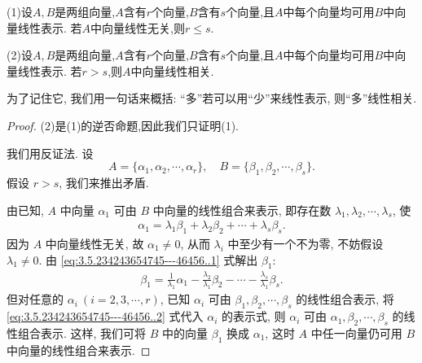 \documentclass[../../main.tex]{subfiles}%
\begin{document}
\begin{lemma}[源泉定理]\label{lemma:源泉定理}
(1)设\(A,B\)是两组向量,\(A\)含有\(r\)个向量,\(B\)含有\(s\)个向量,且\(A\)中每个向量均可用\(B\)中向量线性表示. 若\(A\)中向量线性无关,则\(r\leqslant  s\).

(2)设\(A,B\)是两组向量,\(A\)含有\(r\)个向量,\(B\)含有\(s\)个向量,且\(A\)中每个向量均可用\(B\)中向量线性表示. 若\(r > s\),则\(A\)中向量线性相关.
\end{lemma}
\begin{note}
为了记住它, 我们用一句话来概括: “多”若可以用“少”来线性表示, 则“多”线性相关.
\end{note}
\begin{proof}
(2)是(1)的逆否命题,因此我们只证明(1).

我们用反证法. 设
\[
A = \{\alpha_1, \alpha_2, \cdots, \alpha_r\},
\quad
B = \{\beta_1, \beta_2, \cdots, \beta_s\}.
\]
假设 \( r > s \), 我们来推出矛盾.

由已知, \( A \) 中向量 \( \alpha_1 \) 可由 \( B \) 中向量的线性组合来表示, 即存在数 \( \lambda_1, \lambda_2, \cdots, \lambda_s \), 使
\begin{align}
\alpha_1 = \lambda_1\beta_1 + \lambda_2\beta_2 + \cdots + \lambda_s\beta_s. \label{eq:3.5.234243654745---46456..1}
\end{align}
因为 \( A \) 中向量线性无关, 故 \( \alpha_1 \neq 0 \), 从而 \( \lambda_i \) 中至少有一个不为零, 不妨假设 \( \lambda_1 \neq 0 \). 由 \eqref{eq:3.5.234243654745---46456..1} 式解出 \( \beta_1 \):
\begin{align}
\beta_1 = \frac{1}{\lambda_1}\alpha_1 - \frac{\lambda_2}{\lambda_1}\beta_2 - \cdots - \frac{\lambda_s}{\lambda_1}\beta_s. \label{eq:3.5.234243654745---46456..2}
\end{align}
但对任意的 \( \alpha_i \ (i = 2, 3, \cdots, r) \), 已知 \( \alpha_i \) 可由 \( \beta_1, \beta_2, \cdots, \beta_s \) 的线性组合表示, 将 \eqref{eq:3.5.234243654745---46456..2} 式代入 \( \alpha_i \) 的表示式, 则 \( \alpha_i \) 可由 \( \alpha_1, \beta_2, \cdots, \beta_s \) 的线性组合表示. 这样, 我们可将 \( B \) 中的向量 \( \beta_1 \) 换成 \( \alpha_1 \), 这时 \( A \) 中任一向量仍可用 \( B \) 中向量的线性组合来表示.


\end{proof}
\end{document}
